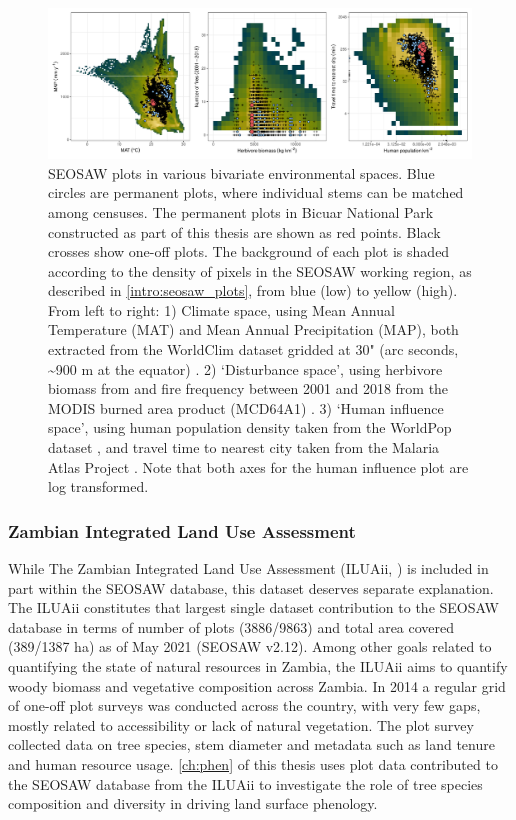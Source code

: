 \begin{refsection}
\begin{figure}
	\includegraphics[width=\linewidth]{img/seosaw_space_all}
	\caption[Distribution of SEOSAW plots in environmental space]{SEOSAW plots in various bivariate environmental spaces. Blue circles are permanent plots, where individual stems can be matched among censuses. The permanent plots in Bicuar National Park constructed as part of this thesis are shown as red points. Black crosses show one-off plots. The background of each plot is shaded according to the density of pixels in the SEOSAW working region, as described in \autoref{intro:seosaw_plots}, from blue (low) to yellow (high). From left to right: 1) Climate space, using Mean Annual Temperature (MAT) and Mean Annual Precipitation (MAP), both extracted from the WorldClim dataset gridded at 30" (arc seconds, \textasciitilde{}900 m at the equator) \citep{Fick2017}. 2) `Disturbance space', using herbivore biomass from \citet{Hempson2017} and fire frequency between 2001 and 2018 from the MODIS burned area product (MCD64A1) \citep{MCD64A1}. 3) `Human influence space', using human population density taken from the WorldPop dataset \citep{Linard2012}, and travel time to nearest city taken from the Malaria Atlas Project \citep{Meijer2018}. Note that both axes for the human influence plot are log transformed.}
	\label{intro:seosaw_space_all}
\end{figure}

\subsubsection{Zambian Integrated Land Use Assessment}
\label{intro:sssec:iluaii}

While The Zambian Integrated Land Use Assessment (ILUAii, \citealt{Mukosha2009}) is included in part within the SEOSAW database, this dataset deserves separate explanation. The ILUAii constitutes that largest single dataset contribution to the SEOSAW database in terms of number of plots (3886/9863) and total area covered (389/1387 ha) as of May 2021 (SEOSAW v2.12). Among other goals related to quantifying the state of natural resources in Zambia, the ILUAii aims to quantify woody biomass and vegetative composition across Zambia. In 2014 a regular grid of one-off plot surveys was conducted across the country, with very few gaps, mostly related to accessibility or lack of natural vegetation. The plot survey collected data on tree species, stem diameter and metadata such as land tenure and human resource usage. \autoref{ch:phen} of this thesis uses plot data contributed to the SEOSAW database from the ILUAii to investigate the role of tree species composition and diversity in driving land surface phenology. 


\end{refsection}
